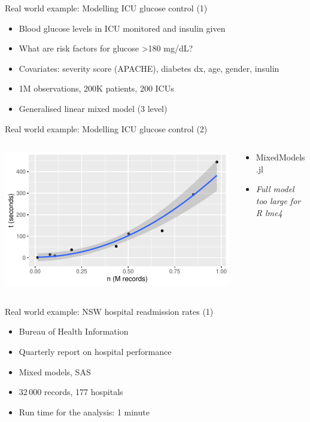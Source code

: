 \documentclass[aspectratio=169,12pt,usepdftitle=false]{beamer} %
\begin{document}
\begin{frame}{Real world example: Modelling ICU glucose control (1)}
    \begin{itemize}
	\item Blood glucose levels in ICU monitored and insulin given
	\item What are risk factors for glucose >180 mg/dL?
	\item Covariates: severity score (APACHE), diabetes dx, age, gender, insulin
	\item 1M observations, 200K patients, 200 ICUs
	\item Generalised linear mixed model (3 level)
    \end{itemize}
\end{frame}

\begin{frame}{Real world example: Modelling ICU glucose control (2)}
\begin{columns}
    \begin{column}{0.65\textwidth}
    \centering
    \includegraphics[height=0.8\textheight]
	    {ref/oisin.pdf}
    \end{column}
    \begin{column}{0.35\textwidth}
	\begin{itemize}
	    \item MixedModels.jl
	    \item \emph{Full model too large for R lme4}
	\end{itemize}
    \end{column}
\end{columns}
\end{frame}

\begin{frame}{Real world example: NSW hospital readmission rates (1)}
    \begin{itemize}
	\item Bureau of Health Information
	\item Quarterly report on hospital performance
	\item Mixed models, SAS
	\item 32\,000 records, 177 hospitals
	\item Run time for the analysis: 1 minute
    \end{itemize}
\end{frame}
\end{document}
